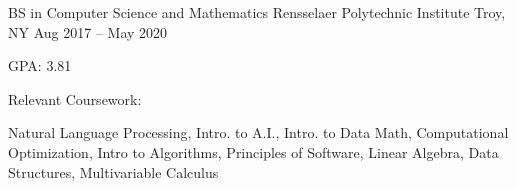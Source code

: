 


\begin{cventries}

  \cventry
  {BS in Computer Science and Mathematics}
  {Rensselaer Polytechnic Institute}
  {Troy, NY}
  {Aug 2017 – May 2020}
  {
    \begin{cvitems}
      \item GPA: 3.81
      \item Relevant Coursework:
      \vspace*{1.15\abovedisplayskip}
      \begin{cvitems}
        \item[] Natural Language Processing, Intro. to A.I., Intro. to Data Math, Computational Optimization,  Intro to Algorithms, Principles of Software, Linear Algebra, Data Structures, Multivariable Calculus
      \end{cvitems}
    \end{cvitems}
  }


\end{cventries}